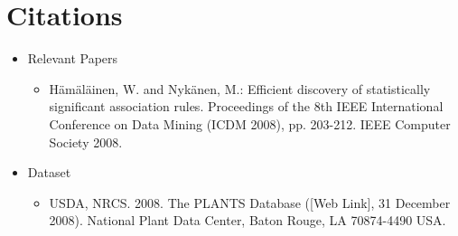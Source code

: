 \documentclass{Group6_Phase2}
\begin{document}
\section{Citations}
\begin{itemize}
	\item Relevant Papers
	\begin{itemize}	
		\item H\"{a}m\"{a}l\"{a}inen, W. and Nyk\"{a}nen, M.: Efficient discovery of statistically significant association rules. Proceedings of the 8th IEEE International Conference on Data Mining (ICDM 2008), pp. 203-212. IEEE Computer Society 2008. 			
	\end{itemize}		
	\item Dataset
		\begin{itemize}		
			\item USDA, NRCS. 2008. The PLANTS Database ([Web Link], 31 December 2008). National Plant Data Center, Baton Rouge, LA 70874-4490 USA.
		\end{itemize}	
\end{itemize}
\end{document}
